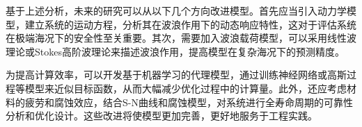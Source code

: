 \documentclass[withoutpreface,bwprint]{cumcmthesis}
\begin{document}
基于上述分析，未来的研究可以从以下几个方向改进模型。首先应当引入动力学模型，建立系统的运动方程，分析其在波浪作用下的动态响应特性，这对于评估系统在极端海况下的安全性至关重要。其次，需要加入波浪载荷模型，可以采用线性波理论或Stokes高阶波理论来描述波浪作用，提高模型在复杂海况下的预测精度。

为提高计算效率，可以开发基于机器学习的代理模型，通过训练神经网络或高斯过程等模型来近似目标函数，从而大幅减少优化过程中的计算量。此外，还应考虑材料的疲劳和腐蚀效应，结合S-N曲线和腐蚀模型，对系统进行全寿命周期的可靠性分析和优化设计。这些改进将使模型更加完善，更好地服务于工程实践。

\nocite{*}

\newpage
\end{document}

